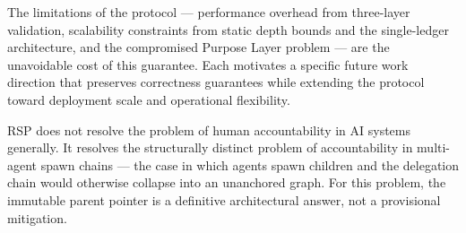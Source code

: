 The limitations of the protocol --- performance overhead from three-layer validation, scalability constraints from static depth bounds and the single-ledger architecture, and the compromised Purpose Layer problem --- are the unavoidable cost of this guarantee. Each motivates a specific future work direction that preserves correctness guarantees while extending the protocol toward deployment scale and operational flexibility.

RSP does not resolve the problem of human accountability in AI systems generally. It resolves the structurally distinct problem of accountability in multi-agent spawn chains --- the case in which agents spawn children and the delegation chain would otherwise collapse into an unanchored graph. For this problem, the immutable parent pointer is a definitive architectural answer, not a provisional mitigation.